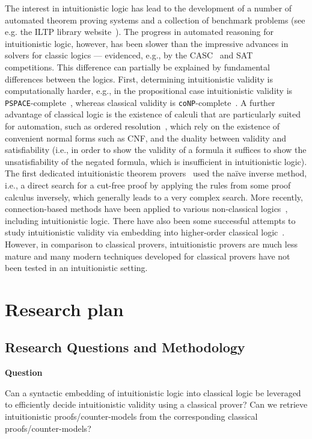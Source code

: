 \documentclass{article}
\theoremstyle{definition}
\theoremstyle{definition}
\theoremstyle{definition}
\theoremstyle{definition}
\theoremstyle{definition}
\theoremstyle{definition}
\theoremstyle{definition}
\newcommand{\0}{\mathbf 0}
\newcommand{\1}{\mathbf 1}
\newcounter{question}
\newenvironment{question}{\smallskip\noindent\textbf{Question \refstepcounter{question}\arabic{question}}\begin{em}}{\end{em}}
\begin{document}
	The interest in intuitionistic logic has lead to the development of a number of automated theorem proving systems and a collection of benchmark problems (see e.g. the ILTP library website~\cite{iltp}).
	The progress in automated reasoning for intuitionistic logic, however, has been slower than the  impressive advances in solvers for classic logics --- evidenced, e.g., by the CASC~\cite{casc} and SAT~\cite{satc} competitions.
	This difference can partially be explained by fundamental differences between the logics.
	First, determining intuitionistic validity is computationally harder, e.g., in the propositional case intuitionistic validity is \verb+PSPACE+-complete~\cite{statman1979intuitionistic}, whereas classical validity is \verb+coNP+-complete~\cite{cook1971complexity}.
	A further advantage of classical logic is the existence of calculi that are particularly suited for automation, such as ordered resolution~\cite{bachmair2001resolution}, which rely on the existence of convenient normal forms such as CNF, and the duality between validity and satisfiability (i.e., in order to show the validity of a formula it suffices to show the unsatisfiability of the negated formula, which is insufficient in intuitionistic logic).
	The first dedicated intuitionistic theorem provers~\cite{mclaughlin2009efficient,tammet1996resolution} used the naïve inverse method, i.e., a direct search for a cut-free proof by applying the rules from some proof calculus inversely, which generally leads to a very complex search.
	More recently, connection-based methods have been applied to various non-classical logics~\cite{otten2005clausal,otten2021nanocop}, including intuitionistic logic.
	There have also been some successful attempts to study intuitionistic validity via embedding into higher-order classical logic~\cite{LEO}.
	However, in comparison to classical provers, intuitionistic provers are much less mature and many modern techniques developed for classical provers have not been tested in an intuitionistic setting.

	\section{Research plan}

	\subsection{Research Questions and Methodology}

	\begin{question}
		Can a syntactic embedding of intuitionistic logic into classical logic be leveraged to efficiently decide intuitionistic validity using a classical prover? Can we retrieve intuitionistic proofs/counter-models from the corresponding classical proofs/counter-models?
	\end{question}
\end{document}
